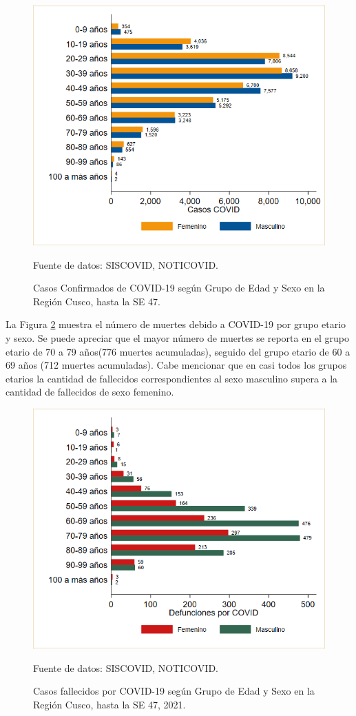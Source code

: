 \documentclass[12pt,a4paper,openany]{book}
\begin{document}
 	
 	
	\begin{figure}[h]
		\caption{Casos Confirmados de COVID-19 según Grupo de Edad y Sexo en la Región Cusco, hasta la SE 47.}\label{fig:casos_edad_sexo}
		\begin{center}
			\includegraphics[width=0.75\linewidth]{../figuras/casos_etapavida}
		\end{center}
		{\footnotesize {Fuente de datos: SISCOVID, NOTICOVID.}}
	\end{figure}
\pagebreak

La Figura  \ref{fig:fallecidos_edad_sexo}  muestra el número de muertes debido a COVID-19 por grupo etario y sexo. Se puede apreciar que el mayor número de muertes se reporta en el grupo etario de 70 a 79 años(776 muertes acumuladas), seguido del grupo etario de 60 a 69 años (712 muertes acumuladas). Cabe mencionar que en casi todos los grupos etarios la cantidad de fallecidos correspondientes al sexo masculino supera a la cantidad de fallecidos de sexo femenino.
	\begin{figure}[h]
		\caption{Casos fallecidos por COVID-19 según Grupo de Edad y Sexo en la Región Cusco, hasta la SE 47, 2021.}\label{fig:fallecidos_edad_sexo}
		\begin{center}
			\includegraphics[width=0.75\linewidth]{../figuras/defunciones_etapavida}
		\end{center}
		{\footnotesize {Fuente de datos: SISCOVID, NOTICOVID.}}
	\end{figure}
\end{document}

